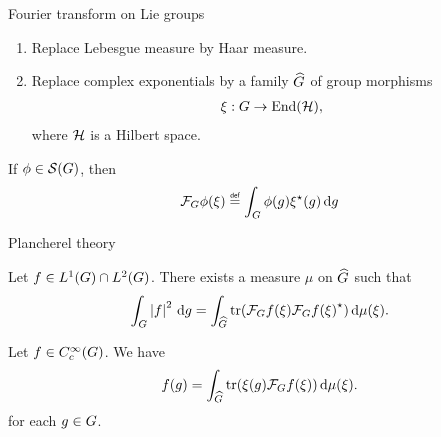 \documentclass{beamer}
\begin{document}
\begin{frame}
    {Fourier transform on Lie groups}

    \begin{enumerate}
        \item Replace Lebesgue measure by Haar measure.
            \pause
        \item Replace complex exponentials by a family ${\widehat{G}}$ of group morphisms
            \begin{align*}
                \xi : G \to \operatorname{End}(\mathcal{H}),
            \end{align*}
            where $\mathcal{H}$ is a Hilbert space.
    \end{enumerate}
    \pause
    If $\phi \in {\mathcal{S} (G)}$,
    then
    \begin{align*}
        \Fourier \phi(\xi) \defeq \int_\Group \phi(g) \adj \xi(g) \dd g
    \end{align*}
\end{frame}

\begin{frame}
    {Plancherel theory}

    \begin{theorem}

        Let $f \in {L^{1} (G)} \cap {L^{2} (G)}$.
        There exists a measure $\mu$ on ${\widehat{G}}$ such that
        \begin{align*}
            \int_G \left|{f}\right|^2 \,\mathrm{d} g
            = \int_{{\widehat{G}}} \operatorname{tr}(\mathcal{F}_{G} f(\xi) {\mathcal{F}_{G} f(\xi)}^\star) \,\mathrm{d} \mu(\xi).
        \end{align*}
    \end{theorem}

    \pause
    \begin{theorem}

        Let $f \in C^\infty_c(G)$.
        We have
        \begin{align*}
            f(g)
            = \int_{{\widehat{G}}} \operatorname{tr}(\xi(g) \mathcal{F}_{G} f(\xi)) \,\mathrm{d} \mu(\xi).
        \end{align*}
        for each $g \in G$.
    \end{theorem}
\end{frame}
\end{document}
